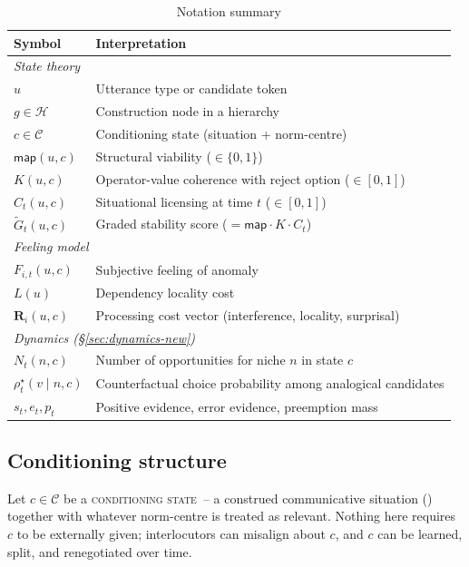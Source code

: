 \documentclass[12pt,letterpaper]{article}
\newcommand{\term}[1]{\textsc{#1}}
\begin{document}
\begin{table}[H]
\centering
\caption{Notation summary}
\label{tab:vars2}
\begin{tabular}{@{}p{3.5cm}l@{}}
\toprule
Symbol & Interpretation\\
\midrule
\multicolumn{2}{l}{\textit{State theory}}\\
$u$ & Utterance type or candidate token\\
$g \in \mathcal{H}$ & Construction node in a hierarchy\\
$c \in \mathcal{C}$ & Conditioning state (situation + norm-centre)\\
$\mathsf{map}(u,c)$ & Structural viability ($\in\{0,1\}$)\\
$K(u,c)$ & Operator-value coherence with reject option ($\in[0,1]$)\\
$C_t(u,c)$ & Situational licensing at time $t$ ($\in[0,1]$)\\
$\widetilde{G}_t(u,c)$ & Graded stability score ($=\mathsf{map}\cdot K \cdot C_t$)\\[3pt]
\multicolumn{2}{l}{\textit{Feeling model}}\\
$F_{i,t}(u,c)$ & Subjective feeling of anomaly\\
$L(u)$ & Dependency locality cost\\
$\mathbf{R}_i(u,c)$ & Processing cost vector (interference, locality, surprisal)\\[3pt]
\multicolumn{2}{l}{\textit{Dynamics (\S\ref{sec:dynamics-new})}}\\
$N_t(n,c)$ & Number of opportunities for niche $n$ in state $c$\\
$\rho_t^\star(v\mid n,c)$ & Counterfactual choice probability among analogical candidates\\
$s_t, e_t, p_t$ & Positive evidence, error evidence, preemption mass\\
\bottomrule
\end{tabular}
\end{table}

\subsection{Conditioning structure}
\label{sec:conditioning}

Let $c\in\mathcal{C}$ be a \term{conditioning state}~-- a construed communicative situation
(\textcite{wiese2023}) together with whatever norm-centre is treated as relevant.
Nothing here requires $c$ to be externally given; interlocutors can misalign about $c$,
and $c$ can be learned, split, and renegotiated over time.
\end{document}
